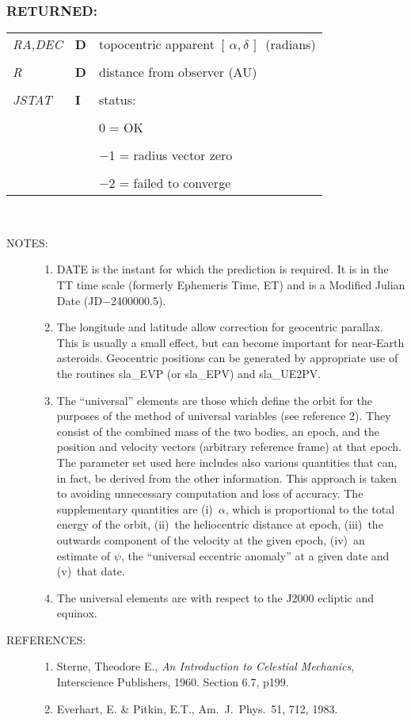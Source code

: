 \documentclass[11pt,twoside,nolof]{starlink}
\providecommand{\radec}     {$[\,\alpha,\delta\,]$}
\newcommand{\args}[2]{
  \subsubsection*{#1:}
     \begin{tabular}{p{7em}p{6em}p{22em}}
       #2
     \end{tabular}\\
}
\newcommand{\spec}[3]
{
  \emph{{#1}} & {\textbf{\mbox{#2}}} & {#3} \\
}
\newcommand{\notes}[1]
 {
   \begin{description}
     \item[NOTES:]
         #1
   \end{description}
}
\renewcommand{\refs}[1]
 {  \begin{description}
     \item[REFERENCES:]
         #1
   \end{description}
}
\begin{document}
\args{RETURNED}
{
 \spec{RA,DEC}{D}{topocentric apparent \radec\ (radians)} \\
 \spec{R}{D}{distance from observer (AU)} \\
 \spec{JSTAT}{I}{status:} \\
 \spec{}{}{\hspace{2.3em}    0 = OK} \\
 \spec{}{}{\hspace{1.5em} $-$1 = radius vector zero} \\
 \spec{}{}{\hspace{1.5em} $-$2 = failed to converge}
}
\notes
{
 \begin{enumerate}
  \item DATE is the instant for which the prediction is
        required.  It is in the TT time scale (formerly
        Ephemeris Time, ET) and is a
        Modified Julian Date (JD$-$2400000.5).
  \item The longitude and latitude allow correction for geocentric
        parallax.  This is usually a small effect, but can become
        important for near-Earth asteroids.  Geocentric positions
        can be generated by appropriate use of the routines
        sla\_EVP (or sla\_EPV) and sla\_UE2PV.
  \item The ``universal'' elements are those which define the orbit for the
        purposes of the method of universal variables (see reference 2).
        They consist of the combined mass of the two bodies, an epoch,
        and the position and velocity vectors (arbitrary reference frame)
        at that epoch.  The parameter set used here includes also various
        quantities that can, in fact, be derived from the other
        information.  This approach is taken to avoiding unnecessary
        computation and loss of accuracy.  The supplementary quantities
        are (i)~$\alpha$, which is proportional to the total energy of the
        orbit, (ii)~the heliocentric distance at epoch,
        (iii)~the outwards component of the velocity at the given epoch,
        (iv)~an estimate of $\psi$, the ``universal eccentric anomaly'' at a
        given date and (v)~that date.
  \item The universal elements are with respect to the J2000 ecliptic
        and equinox.
 \end{enumerate}
}
\refs{
   \begin{enumerate}
   \item Sterne, Theodore E., \textit{An Introduction to Celestial Mechanics,}\/
         Interscience Publishers, 1960.  Section 6.7, p199.
   \item Everhart, E. \& Pitkin, E.T., Am.~J.~Phys.~51, 712, 1983.
   \end{enumerate}
}
\end{document}
